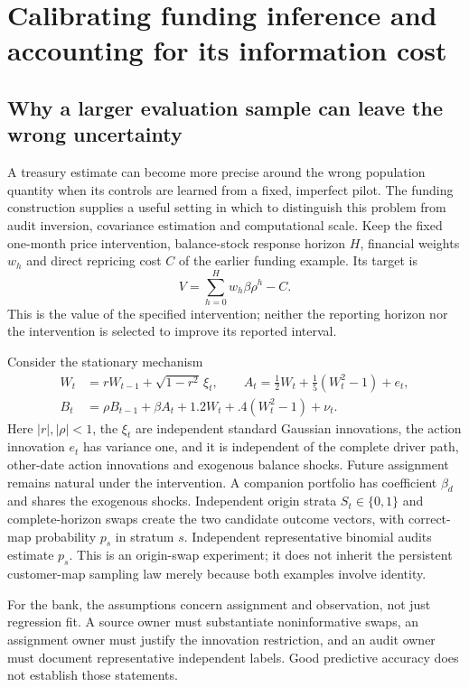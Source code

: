 \chapter{Calibrating funding inference and accounting for its information cost}
\label{v9:chapter}

\section{Why a larger evaluation sample can leave the wrong uncertainty}
\label{v9:target}

A treasury estimate can become more precise around the wrong population
quantity when its controls are learned from a fixed, imperfect pilot. The
funding construction supplies a useful setting in which to distinguish this
problem from audit inversion, covariance estimation and computational scale.
Keep the fixed one-month price intervention, balance-stock response horizon
$H$, financial weights $w_h$ and direct repricing cost $C$ of the earlier
funding example. Its target is
\[
 V=\sum_{h=0}^{H}w_h\beta\rho^h-C.
\]
This is the value of the specified intervention; neither the reporting horizon
nor the intervention is selected to improve its reported interval.

Consider the stationary mechanism
\begin{align}
 W_t&=rW_{t-1}+\sqrt{1-r^2}\,\xi_t,\qquad
 A_t=\tfrac12W_t+\tfrac15(W_t^2-1)+e_t, \label{v9:law}\\
 B_t&=\rho B_{t-1}+\beta A_t+1.2W_t+.4(W_t^2-1)+\nu_t.
\end{align}
Here $|r|,|\rho|<1$, the $\xi_t$ are independent standard Gaussian innovations,
the action innovation $e_t$ has variance one, and it is
independent of the complete driver path, other-date action innovations and
exogenous balance shocks. Future assignment remains natural under the
intervention. A companion portfolio has coefficient $\beta_d$ and shares the
exogenous shocks. Independent origin strata $S_t\in\{0,1\}$ and complete-horizon
swaps create the two candidate outcome vectors, with correct-map probability
$p_s$ in stratum $s$. Independent representative binomial audits estimate
$p_s$. This is an origin-swap experiment; it does not inherit the persistent
customer-map sampling law merely because both examples involve identity.

For the bank, the assumptions concern assignment and observation, not just
regression fit. A source owner must substantiate noninformative swaps, an
assignment owner must justify the innovation restriction, and an audit owner
must document representative independent labels. Good predictive accuracy
does not establish those statements.


